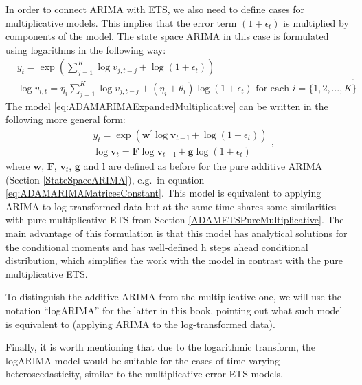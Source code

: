 \documentclass[
]{book}
\theoremstyle{definition}
\theoremstyle{definition}
\theoremstyle{definition}
\theoremstyle{definition}
\theoremstyle{remark}
\begin{document}
In order to connect ARIMA with ETS, we also need to define cases for multiplicative models. This implies that the error term \((1+\epsilon_t)\) is multiplied by components of the model. The state space ARIMA in this case is formulated using logarithms in the following way:
\begin{equation}
  \begin{aligned}
    &{y}_{t} = \exp \left( \sum_{j=1}^K \log v_{j,t-j} + \log(1+\epsilon_t) \right) \\
    &\log v_{i,t} = \eta_i \sum_{j=1}^K \log v_{j,t-j} + (\eta_i + \theta_i) \log(1+\epsilon_t) \text{ for each } i=\{1, 2, \dots, K \}
  \end{aligned}.
  \label{eq:ADAMARIMAExpandedMultiplicative}
\end{equation}
The model \eqref{eq:ADAMARIMAExpandedMultiplicative} can be written in the following more general form:
\begin{equation}
  \begin{aligned}
    &{y}_{t} = \exp \left( \mathbf{w}^\prime \log \mathbf{v}_{t-\mathbf{l}} + \log(1+\epsilon_t) \right) \\
    &\log \mathbf{v}_{t} = \mathbf{F} \log \mathbf{v}_{t-\mathbf{l}} + \mathbf{g} \log(1+\epsilon_t)
  \end{aligned},
  \label{eq:ADAMStateSpaceMultiplicative}
\end{equation}
where \(\mathbf{w}\), \(\mathbf{F}\), \(\mathbf{v}_t\), \(\mathbf{g}\) and \(\mathbf{l}\) are defined as before for the pure additive ARIMA (Section \ref{StateSpaceARIMA}), e.g.~in equation \eqref{eq:ADAMARIMAMatricesConstant}. This model is equivalent to applying ARIMA to log-transformed data but at the same time shares some similarities with pure multiplicative ETS from Section \ref{ADAMETSPureMultiplicative}. The main advantage of this formulation is that this model has analytical solutions for the conditional moments and has well-defined h steps ahead conditional distribution, which simplifies the work with the model in contrast with the pure multiplicative ETS.

To distinguish the additive ARIMA from the multiplicative one, we will use the notation ``logARIMA'' for the latter in this book, pointing out what such model is equivalent to (applying ARIMA to the log-transformed data).

Finally, it is worth mentioning that due to the logarithmic transform, the logARIMA model would be suitable for the cases of time-varying heteroscedasticity, similar to the multiplicative error ETS models.
\end{document}
